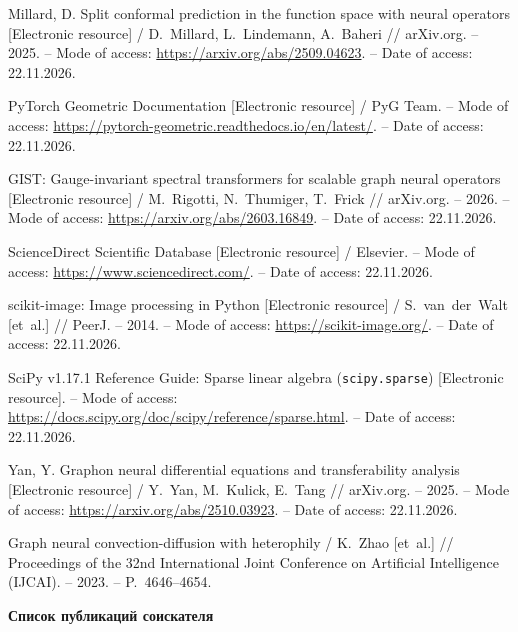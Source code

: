 {
Millard, D. Split conformal prediction in the function space with neural operators [Electronic resource] / D.~Millard, L.~Lindemann, A.~Baheri // arXiv.org. -- 2025. -- Mode of access: \url{https://arxiv.org/abs/2509.04623}. -- Date of access: 22.11.2026.

PyTorch Geometric Documentation [Electronic resource] / PyG Team. -- Mode of access: \url{https://pytorch-geometric.readthedocs.io/en/latest/}. -- Date of access: 22.11.2026.

GIST: Gauge-invariant spectral transformers for scalable graph neural operators [Electronic resource] / M.~Rigotti, N.~Thumiger, T.~Frick // arXiv.org. -- 2026. -- Mode of access: \url{https://arxiv.org/abs/2603.16849}. -- Date of access: 22.11.2026.

ScienceDirect Scientific Database [Electronic resource] / Elsevier. -- Mode of access: \url{https://www.sciencedirect.com/}. -- Date of access: 22.11.2026.

scikit-image: Image processing in Python [Electronic resource] / S.~van~der~Walt [et~al.] // PeerJ. -- 2014. -- Mode of access: \url{https://scikit-image.org/}. -- Date of access: 22.11.2026.

SciPy v1.17.1 Reference Guide: Sparse linear algebra (\texttt{scipy.sparse}) [Electronic resource]. -- Mode of access: \url{https://docs.scipy.org/doc/scipy/reference/sparse.html}. -- Date of access: 22.11.2026.

Yan, Y. Graphon neural differential equations and transferability analysis [Electronic resource] / Y.~Yan, M.~Kulick, E.~Tang // arXiv.org. -- 2025. -- Mode of access: \url{https://arxiv.org/abs/2510.03923}. -- Date of access: 22.11.2026.

Graph neural convection-diffusion with heterophily / K.~Zhao [et~al.] // Proceedings of the 32nd International Joint Conference on Artificial Intelligence (IJCAI). -- 2023. -- P.~4646--4654.

}

\vspace{0.4cm}
\noindent\textbf{Список публикаций соискателя}
\vspace{0.2cm}

